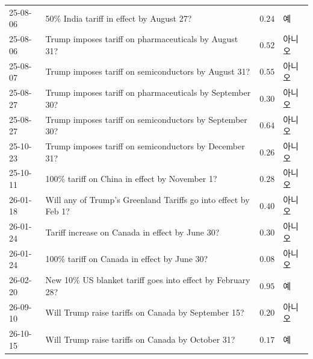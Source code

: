 \documentclass[11pt,a4paper]{article}
\begin{document}
\begin{tabularx}{\textwidth}{@{}lYrl@{}}
25-08-06 & 50\% India tariff in effect by August 27? & $0.24$ & 예\\
25-08-06 & Trump imposes tariff on pharmaceuticals by August 31? & $0.52$ & 아니오\\
25-08-07 & Trump imposes tariff on semiconductors by August 31? & $0.55$ & 아니오\\
25-08-27 & Trump imposes tariff on pharmaceuticals by September 30? & $0.30$ & 아니오\\
25-08-27 & Trump imposes tariff on semiconductors by September 30? & $0.64$ & 아니오\\
25-10-23 & Trump imposes tariff on semiconductors by December 31? & $0.26$ & 아니오\\
25-10-11 & 100\% tariff on China in effect by November 1? & $0.28$ & 아니오\\
26-01-18 & Will any of Trump's Greenland Tariffs go into effect by Feb 1? & $0.40$ & 아니오\\
26-01-24 & Tariff increase on Canada in effect by June 30? & $0.30$ & 아니오\\
26-01-24 & 100\% tariff on Canada in effect by June 30? & $0.08$ & 아니오\\
26-02-20 & New 10\% US blanket tariff goes into effect by February 28? & $0.95$ & 예\\
26-09-10 & Will Trump raise tariffs on Canada by September 15? & $0.20$ & 아니오\\
26-10-15 & Will Trump raise tariffs on Canada by October 31? & $0.17$ & 예\\
\bottomrule
\end{tabularx}
\endgroup
\end{document}
